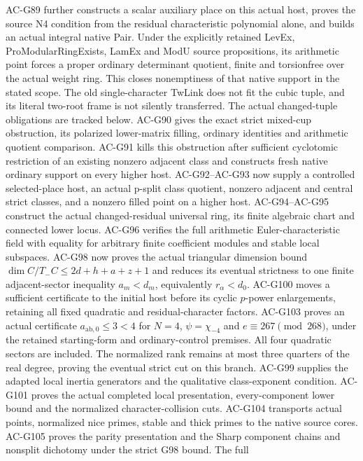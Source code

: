 \documentclass[11pt,a4paper]{article}
\theoremstyle{definition}
\theoremstyle{remark}
\begin{document}
AC-G89 further constructs a scalar auxiliary place on this actual
host, proves the source N4 condition from the residual characteristic
polynomial alone, and builds an actual integral native Pair.
Under the explicitly retained LevEx, ProModularRingExists, LamEx
and ModU source propositions, its arithmetic point forces a proper
ordinary determinant quotient, finite and torsionfree over the actual
weight ring.  This closes nonemptiness of that native support in the
stated scope.  The old single-character TwLink does not fit the cubic
tuple, and its literal two-root frame is not silently transferred. The actual
changed-tuple obligations are tracked below.
AC-G90 gives the exact strict mixed-cup obstruction, its polarized
lower-matrix filling, ordinary identities and arithmetic quotient
comparison.  AC-G91 kills this obstruction after sufficient cyclotomic
restriction of an existing nonzero adjacent class and constructs fresh
native ordinary support on every higher host. AC-G92--AC-G93 now
supply a controlled selected-place host, an actual p-split class quotient,
nonzero adjacent and central strict classes, and a nonzero filled point
on a higher host. AC-G94--AC-G95 construct the actual changed-residual
universal ring, its finite algebraic chart and connected lower locus.
AC-G96 verifies the full arithmetic Euler-characteristic field with
equality for arbitrary finite coefficient modules and stable local
subspaces. AC-G98 now proves the actual triangular dimension bound
$\dim C/T_-C\leq 2d+h+a+z+1$ and reduces its eventual strictness
to one finite adjacent-sector inequality $a_m<d_m$, equivalently
$r_\alpha<d_0$. AC-G100 moves a sufficient certificate to the initial
host before its cyclic $p$-power enlargements, retaining all fixed
quadratic and residual-character factors. AC-G103 proves an actual
certificate $a_{\mathrm{ab},0}\leq3<4$ for $N=4$,
$\psi=\chi_{-4}$ and $e\equiv267\pmod{268}$, under the retained
starting-form and ordinary-control premises. All four quadratic sectors
are included. The normalized rank remains at most three quarters of the
real degree, proving the eventual strict cut on this branch.
AC-G99 supplies the adapted local inertia generators and the qualitative
class-exponent condition. AC-G101 proves the actual completed local
presentation, every-component lower bound and the normalized
character-collision cuts. AC-G104 transports actual points, normalized
nice primes, stable and thick primes to the native source cores.
AC-G105 proves the parity presentation and the Sharp component
chains and nonsplit dichotomy under the strict G98 bound. The full
\end{document}
